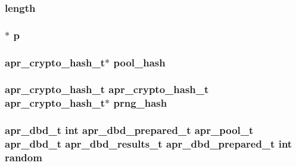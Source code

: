 \subsubsection[{\texorpdfstring{length}{length}}]{ length}\hypertarget{group__apr__random_ga1e201727989c3a1c4901ee4c30d2e8fa}{}\label{group__apr__random_ga1e201727989c3a1c4901ee4c30d2e8fa}
\subsubsection[{\texorpdfstring{p}{p}}]{$\ast$ p}\hypertarget{group__apr__random_ga2e727f881424334cf12d8af10f50ec6c}{}\label{group__apr__random_ga2e727f881424334cf12d8af10f50ec6c}
\subsubsection[{\texorpdfstring{pool\+\_\+hash}{pool_hash}}]{ {\bf apr\+\_\+crypto\+\_\+hash\+\_\+t}$\ast$ pool\+\_\+hash}\hypertarget{group__apr__random_ga467948cb4cf4e6c6531ec82add319f77}{}\label{group__apr__random_ga467948cb4cf4e6c6531ec82add319f77}
\subsubsection[{\texorpdfstring{prng\+\_\+hash}{prng_hash}}]{ {\bf apr\+\_\+crypto\+\_\+hash\+\_\+t} {\bf apr\+\_\+crypto\+\_\+hash\+\_\+t} {\bf apr\+\_\+crypto\+\_\+hash\+\_\+t}$\ast$ prng\+\_\+hash}\hypertarget{group__apr__random_gac92511b46c28b5d66795bde787ad8f84}{}\label{group__apr__random_gac92511b46c28b5d66795bde787ad8f84}
\subsubsection[{\texorpdfstring{random}{random}}]{ {\bf apr\+\_\+dbd\+\_\+t} {\bf int} {\bf apr\+\_\+dbd\+\_\+prepared\+\_\+t} {\bf apr\+\_\+pool\+\_\+t} {\bf apr\+\_\+dbd\+\_\+t} {\bf apr\+\_\+dbd\+\_\+results\+\_\+t} {\bf apr\+\_\+dbd\+\_\+prepared\+\_\+t} {\bf int} random}\hypertarget{group__apr__random_gac93942ec5efab7a3d75b75e70c8c7a94}{}\label{group__apr__random_gac93942ec5efab7a3d75b75e70c8c7a94}
